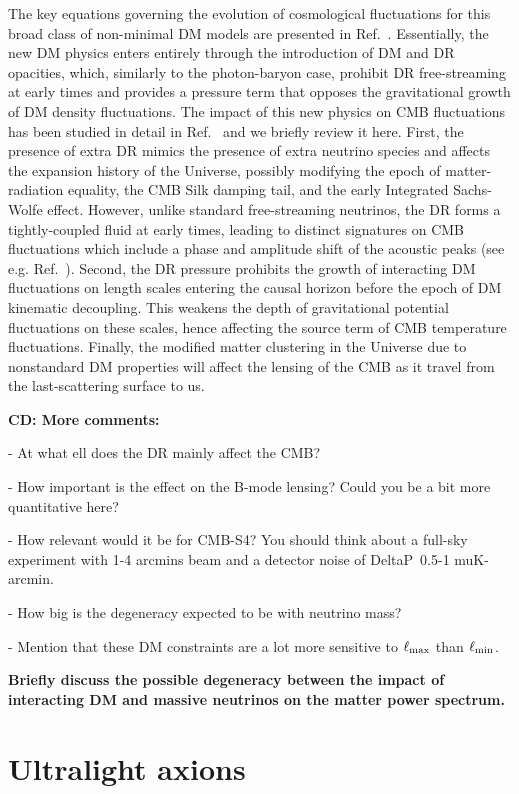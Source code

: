 The key equations governing the evolution of cosmological fluctuations for this broad class of non-minimal DM models are presented in Ref.~\cite{Cyr-Racine:2015ihg}. Essentially, the new DM physics enters entirely through the introduction of DM and DR opacities, which, similarly to the photon-baryon case, prohibit DR free-streaming at early times and provides a pressure term that opposes the gravitational growth of DM density fluctuations. The impact of this new physics on CMB fluctuations has been studied in detail in Ref.~\cite{Cyr-Racine:2013fsa} and we briefly review it here. First, the presence of extra DR mimics the presence of extra neutrino species and affects the expansion history of the Universe, possibly modifying the epoch of matter-radiation equality, the CMB Silk damping tail, and the early Integrated Sachs-Wolfe effect. However, unlike standard free-streaming neutrinos, the DR forms a tightly-coupled fluid at early times, leading to distinct signatures on CMB fluctuations which include a phase and amplitude shift of the acoustic peaks (see e.g. Ref.~\cite{Bashinsky:2003tk,Cyr-Racine:2013jua,Follin:2015hya}). Second, the DR pressure prohibits the growth of interacting DM fluctuations on length scales entering the causal horizon before the epoch of DM kinematic decoupling. This weakens the depth of gravitational potential fluctuations on these scales, hence affecting the source term of CMB temperature fluctuations. Finally, the modified matter clustering in the Universe due to nonstandard DM properties will affect the lensing of the CMB as it travel from the last-scattering surface to us.

{\bf CD: More comments:

- At what ell does the DR mainly affect the CMB?

- How important is the effect on the B-mode lensing? Could you be a bit more quantitative here?

- How relevant would it be for CMB-S4? You should think about a full-sky experiment with 1-4 arcmins beam and a detector noise of DeltaP~0.5-1 muK-arcmin.

- How big is the degeneracy expected to be with neutrino mass?

- Mention that these DM constraints are a lot more sensitive to $\ell_{\rm max}$ than $\ell_{\rm min}$.}

{\bf Briefly discuss the possible degeneracy between the impact of interacting DM and massive neutrinos on the matter power spectrum.}

\section{Ultralight axions}

